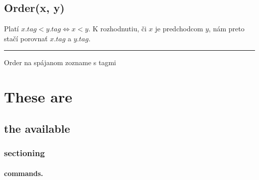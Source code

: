 \documentclass[
  digital,     %
  oneside,     %
  nosansbold,  %
  nocolorbold, %
  lof,         %
  lot,         %
]{fithesis4}
\begin{document}
\section{Order(x, y)}
Platí $x.tag < y.tag \iff x < y$. 
K rozhodnutiu, či $x$ je predchodcom $y$, nám preto stačí porovnať  $x.tag$ a $y.tag$.

\begin{algorithm}
\hrule\vspace{0.2em}
\;
\caption{Order na spájanom zozname s tagmi}
\end{algorithm}

\clearpage

\chapter{These are}
\section{the available}
\subsection{sectioning}
\subsubsection{commands.}
\end{document}

